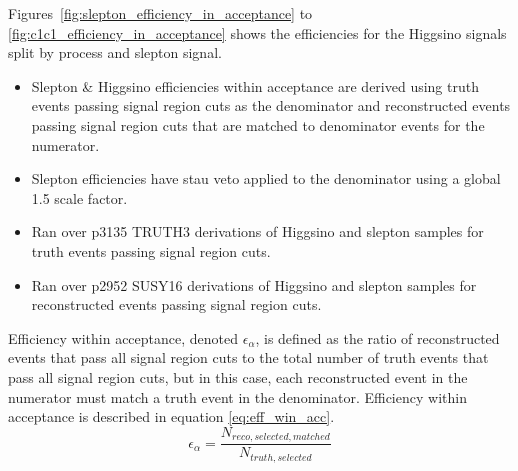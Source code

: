 Figures~\ref{fig:slepton_efficiency_in_acceptance} to \ref{fig:c1c1_efficiency_in_acceptance} shows
the efficiencies for the Higgsino signals split by process and slepton signal.

\begin{itemize}
\item Slepton \& Higgsino efficiencies within acceptance are derived using truth events passing signal region cuts as the  denominator and reconstructed events passing signal region cuts that are matched to denominator events for the numerator.
\item Slepton efficiencies have stau veto applied to the denominator using a global 1.5 scale factor.
\item Ran over p3135 TRUTH3 derivations of Higgsino and slepton samples for truth events passing signal region cuts.
\item Ran over p2952 SUSY16 derivations of Higgsino and slepton samples for reconstructed events passing signal region cuts.
\end{itemize}

Efficiency within acceptance, denoted $\epsilon_{\alpha}$, is defined as the ratio of reconstructed events that pass all signal region cuts to the total number of truth events that pass all signal region cuts, but in this case, each reconstructed event in the numerator must match a truth event in the denominator. Efficiency within acceptance is described in equation \ref{eq:eff_win_acc}.\\
\begin{equation}
\epsilon_{\alpha} = \frac{N_{reco,selected,matched}}{N_{truth,selected}}
\label{eq:eff_win_acc}
\end{equation}
\FloatBarrier

